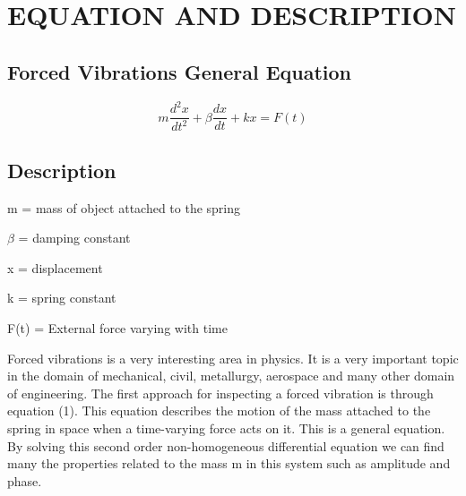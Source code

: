 \section{EQUATION AND DESCRIPTION}

\subsection{Forced Vibrations General Equation}

    $$ m \frac {d^2x}{dt^2} + \beta \frac{dx}{dt}+kx = F(t) $$

\subsection{Description}

\begin{center}

m = mass of object attached to the spring

\newlines

$\beta$ = damping constant

\newline

x = displacement

\newline

k = spring constant

\newline

F(t) = External force varying with time

\end{center}

Forced vibrations is a very interesting area in physics. It is a very important topic in the domain of mechanical, civil, metallurgy, aerospace and many other domain of engineering. The first approach for inspecting a forced vibration is through equation (1). This equation describes the motion of the mass attached to the spring in space when a time-varying force acts on it. This is a general equation. By solving this second order non-homogeneous differential equation we can find many the properties related to the mass m in this system such as amplitude and phase.













